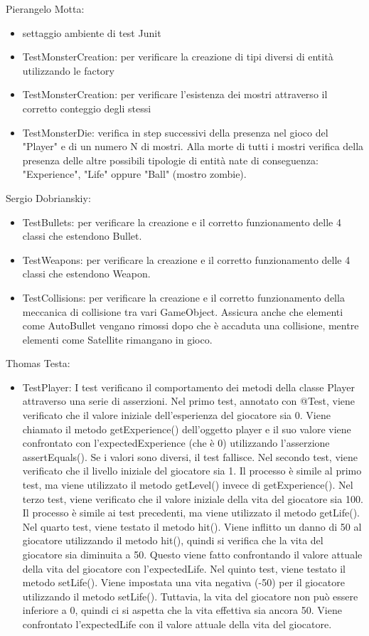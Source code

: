 \documentclass[a4paper,12pt]{report}
\begin{document}
Pierangelo Motta:
\begin{itemize}
	\item settaggio ambiente di test Junit
	\item TestMonsterCreation: per verificare la creazione di tipi diversi di entità utilizzando le factory
	\item TestMonsterCreation: per verificare l'esistenza dei mostri attraverso il corretto conteggio degli stessi
	\item TestMonsterDie: verifica in step successivi della presenza nel gioco del "Player" e di un numero N di mostri. Alla morte di tutti i mostri verifica della presenza delle altre possibili tipologie di entità nate di conseguenza: "Experience", "Life" oppure "Ball" (mostro zombie).
\end{itemize}
%
Sergio Dobrianskiy:
\begin{itemize}
	\item TestBullets: per verificare la creazione e il corretto funzionamento delle 4 classi che estendono Bullet.
	\item TestWeapons: per verificare la creazione e il corretto funzionamento delle 4 classi che estendono Weapon.
	\item TestCollisions: per verificare la creazione e il corretto funzionamento della meccanica di collisione tra vari GameObject. Assicura anche che elementi come AutoBullet vengano rimossi dopo che è accaduta una collisione, mentre elementi come Satellite rimangano in gioco.
\end{itemize}
%
Thomas Testa:
\begin{itemize}
	\item TestPlayer: I test verificano il comportamento dei metodi della classe Player attraverso una serie di asserzioni.
	Nel primo test, annotato con @Test, viene verificato che il valore iniziale dell'esperienza del giocatore sia 0. Viene chiamato il metodo getExperience() dell'oggetto player e il suo valore viene confrontato con l'expectedExperience (che è 0) utilizzando l'asserzione assertEquals(). Se i valori sono diversi, il test fallisce.
    Nel secondo test, viene verificato che il livello iniziale del giocatore sia 1. Il processo è simile al primo test, ma viene utilizzato il metodo getLevel() invece di getExperience().
    Nel terzo test, viene verificato che il valore iniziale della vita del giocatore sia 100. Il processo è simile ai test precedenti, ma viene utilizzato il metodo getLife().
    Nel quarto test, viene testato il metodo hit(). Viene inflitto un danno di 50 al giocatore utilizzando il metodo hit(), quindi si verifica che la vita del giocatore sia diminuita a 50. Questo viene fatto confrontando il valore attuale della vita del giocatore con l'expectedLife.
    Nel quinto test, viene testato il metodo setLife(). Viene impostata una vita negativa (-50) per il giocatore utilizzando il metodo setLife(). Tuttavia, la vita del giocatore non può essere inferiore a 0, quindi ci si aspetta che la vita effettiva sia ancora 50. Viene confrontato l'expectedLife con il valore attuale della vita del giocatore.
\end{itemize}
\end{document}
